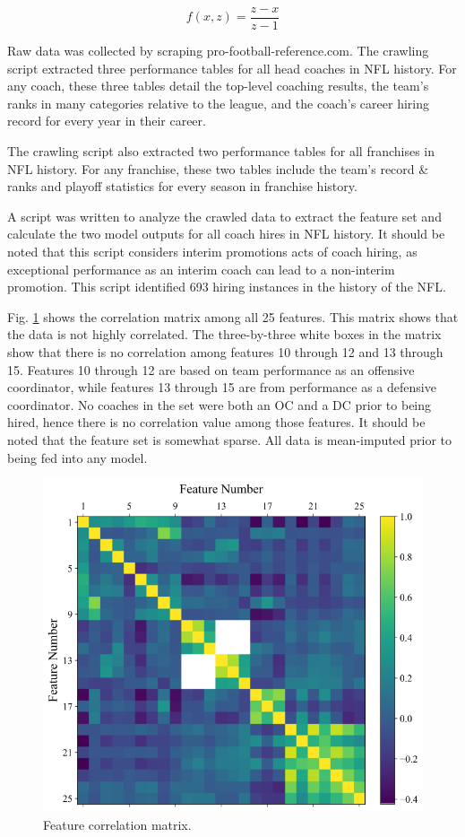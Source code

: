 \documentclass[conference]{IEEEtran}
\begin{document}
\begin{equation}
        f(x,z) = \frac{z-x}{z-1}
        \label{eq3}
\end{equation}

Raw data was collected by scraping pro-football-reference.com. The crawling script extracted three performance tables for all head coaches in NFL history. For any coach, these three tables detail the top-level coaching results, the team's ranks in many categories relative to the league, and the coach's career hiring record for every year in their career. 

The crawling script also extracted two performance tables for all franchises in NFL history. For any franchise, these two tables include the team's record \& ranks and playoff statistics for every season in franchise history.

A script was written to analyze the crawled data to extract the feature set and calculate the two model outputs for all coach hires in NFL history. It should be noted that this script considers interim promotions acts of coach hiring, as exceptional performance as an interim coach can lead to a non-interim promotion. This script identified 693 hiring instances in the history of the NFL.

Fig. \ref{fig1} shows the correlation matrix among all 25 features. This matrix shows that the data is not highly correlated. The three-by-three white boxes in the matrix show that there is no correlation among features 10 through 12 and 13 through 15. Features 10 through 12 are based on team performance as an offensive coordinator, while features 13 through 15 are from performance as a defensive coordinator. No coaches in the set were both an OC and a DC prior to being hired, hence there is no correlation value among those features. It should be noted that the feature set is somewhat sparse. All data is mean-imputed prior to being fed into any model.

\begin{figure}[htbp]
\centerline{\includegraphics[width=1\linewidth]{corr.png}}
\caption{Feature correlation matrix.}
\label{fig1}
\end{figure}
\end{document}
